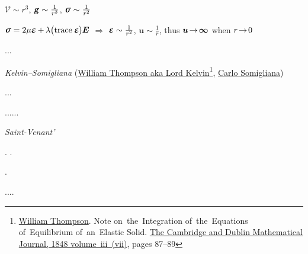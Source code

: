 \nopagebreak\vspace{-1em}\noindent
\hfill
${\mathcal{V} \sim r^3}$, ${\textbf{\textsl{g}} \sim \frac{1}{r^3}}$, ${\linearstress \sim \frac{1}{r^2}}$

\noindent
\hfill
${\linearstress
= 2 \thesecondlameparameter \infinitesimaldeformation
\hspace{-0.1ex} + \hspace{-0.1ex} \thefirstlameparameter \bigl( \trace{\infinitesimaldeformation} \hspace{-0.1ex} \bigr) \hspace{-0.1ex} \UnitDyad }$
$\Rightarrow$
${\infinitesimaldeformation \sim \frac{1}{r^2}}$, ${\bm{u} \sim \frac{1}{r}}$,
thus ${\bm{u} \hspace{-0.33ex}\to\hspace{-0.33ex} \bm{\infty}}$ when ${r \hspace{-0.33ex}\to\hspace{-0.33ex} 0}$

...

\noindent
\emph{ Kelvin\hbox{--}Somigliana}
(\href{https://en.wikipedia.org/wiki/Lord_Kelvin}{William Thompson aka Lord Kelvin}\footnote{%
\href{https://en.wikipedia.org/wiki/Lord_Kelvin}{William  Thompson}.
Note on~the~Integration of~the~Equations of~Equilibrium of~an~Elastic Solid.
\href{https://ia904507.us.archive.org/25/items/sim_cambridge-and-dublin-mathematical-journal_1848_7/sim_cambridge-and-dublin-mathematical-journal_1848_7.pdf}{The Cambridge and Dublin Mathematical Journal, 1848 volume~iii~(vii)},
pages 87\hbox{--}89
}\hbox{\hspace{-0.55ex},}
\href{https://en.wikipedia.org/wiki/Carlo_Somigliana}{Carlo Somigliana})

... ~

......

\noindent
\emph{ Saint-Venant’}

\ru{,}
.
%
.

\ru{,}
\en{,}
.

....
